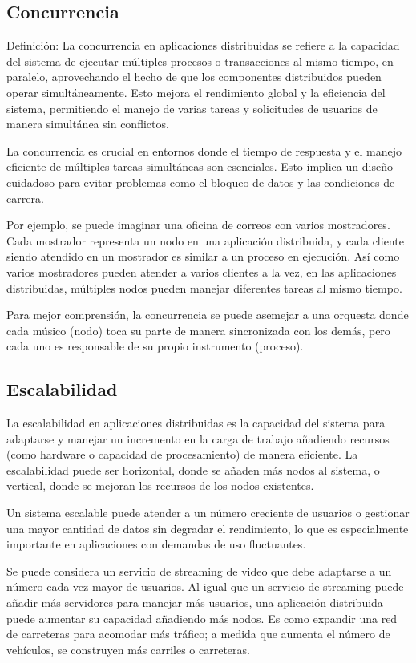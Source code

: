 \subsection{Concurrencia}

Definición: La concurrencia en aplicaciones distribuidas se refiere a la capacidad del sistema de ejecutar múltiples procesos o transacciones al mismo tiempo, en paralelo, aprovechando el hecho de que los componentes distribuidos pueden operar simultáneamente. Esto mejora el rendimiento global y la eficiencia del sistema, permitiendo el manejo de varias tareas y solicitudes de usuarios de manera simultánea sin conflictos.

La concurrencia es crucial en entornos donde el tiempo de respuesta y el manejo eficiente de múltiples tareas simultáneas son esenciales. Esto implica un diseño cuidadoso para evitar problemas como el bloqueo de datos y las condiciones de carrera.

Por ejemplo, se puede imaginar una oficina de correos con varios mostradores. Cada mostrador representa un nodo en una aplicación distribuida, y cada cliente siendo atendido en un mostrador es similar a un proceso en ejecución. Así como varios mostradores pueden atender a varios clientes a la vez, en las aplicaciones distribuidas, múltiples nodos pueden manejar diferentes tareas al mismo tiempo.

Para mejor comprensión, la concurrencia se puede asemejar a una orquesta donde cada músico (nodo) toca su parte de manera sincronizada con los demás, pero cada uno es responsable de su propio instrumento (proceso).

\subsection{Escalabilidad}

La escalabilidad en aplicaciones distribuidas es la capacidad del sistema para adaptarse y manejar un incremento en la carga de trabajo añadiendo recursos (como hardware o capacidad de procesamiento) de manera eficiente. La escalabilidad puede ser horizontal, donde se añaden más nodos al sistema, o vertical, donde se mejoran los recursos de los nodos existentes.

Un sistema escalable puede atender a un número creciente de usuarios o gestionar una mayor cantidad de datos sin degradar el rendimiento, lo que es especialmente importante en aplicaciones con demandas de uso fluctuantes.

Se puede considera un servicio de streaming de video que debe adaptarse a un número cada vez mayor de usuarios. Al igual que un servicio de streaming puede añadir más servidores para manejar más usuarios, una aplicación distribuida puede aumentar su capacidad añadiendo más nodos. Es como expandir una red de carreteras para acomodar más tráfico; a medida que aumenta el número de vehículos, se construyen más carriles o carreteras.

